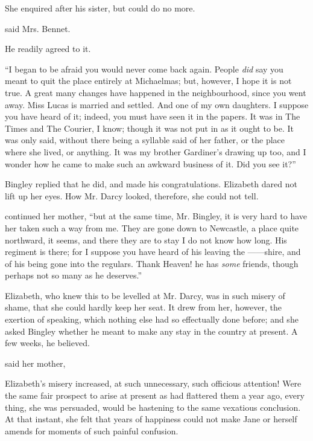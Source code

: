 She enquired after his sister, but could do no more.

 said Mrs. Bennet.

He readily agreed to it.

“I began to be afraid you would never come back again. People {\em did} say you meant to quit the place entirely at Michaelmas; but, however, I hope it is not true. A great many changes have happened in the neighbourhood, since you went away. Miss Lucas is married and settled. And one of my own daughters. I suppose you have heard of it; indeed, you must have seen it in the papers. It was in The Times and The Courier, I know; though it was not put in as it ought to be. It was only said,  without there being a syllable said of her father, or the place where she lived, or anything. It was my brother Gardiner's drawing up too, and I wonder how he came to make such an awkward business of it. Did you see it?”

Bingley replied that he did, and made his congratulations. Elizabeth dared not lift up her eyes. How Mr. Darcy looked, therefore, she could not tell.

 continued her mother, “but at the same time, Mr. Bingley, it is very hard to have her taken such a way from me. They are gone down to Newcastle, a place quite northward, it seems, and there they are to stay I do not know how long. His regiment is there; for I suppose you have heard of his leaving the ------shire, and of his being gone into the regulars. Thank Heaven! he has {\em some} friends, though perhaps not so many as he deserves.”

Elizabeth, who knew this to be levelled at Mr. Darcy, was in such misery of shame, that she could hardly keep her seat. It drew from her, however, the exertion of speaking, which nothing else had so effectually done before; and she asked Bingley whether he meant to make any stay in the country at present. A few weeks, he believed.

 said her mother, 

Elizabeth's misery increased, at such unnecessary, such officious attention! Were the same fair prospect to arise at present as had flattered them a year ago, every thing, she was persuaded, would be hastening to the same vexatious conclusion. At that instant, she felt that years of happiness could not make Jane or herself amends for moments of such painful confusion.

